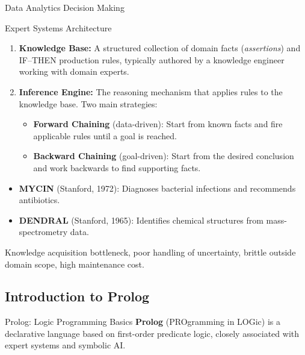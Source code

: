 \begin{v3topic}{Data Analytics Decision Making}
\begin{v3topic}{Expert Systems Architecture}
        \begin{enumerate}
            \item \textbf{Knowledge Base:} A structured collection of domain facts (\emph{assertions}) and IF--THEN production rules, typically authored by a knowledge engineer working with domain experts.
            \item \textbf{Inference Engine:} The reasoning mechanism that applies rules to the knowledge base. Two main strategies:
            \begin{itemize}
                \item \textbf{Forward Chaining} (data-driven): Start from known facts and fire applicable rules until a goal is reached.
                \item \textbf{Backward Chaining} (goal-driven): Start from the desired conclusion and work backwards to find supporting facts.
            \end{itemize}
        \end{enumerate}

        \begin{itemize}
            \item \textbf{MYCIN} (Stanford, 1972): Diagnoses bacterial infections and recommends antibiotics.
            \item \textbf{DENDRAL} (Stanford, 1965): Identifies chemical structures from mass-spectrometry data.
        \end{itemize}

        Knowledge acquisition bottleneck, poor handling of uncertainty, brittle outside domain scope, high maintenance cost.
\end{v3topic}

    \subsection{Introduction to Prolog}

\begin{v3topic}{Prolog: Logic Programming Basics}
        \textbf{Prolog} (PROgramming in LOGic) is a declarative language based on first-order predicate logic, closely associated with expert systems and symbolic AI.


\end{v3topic}
\end{v3topic}
